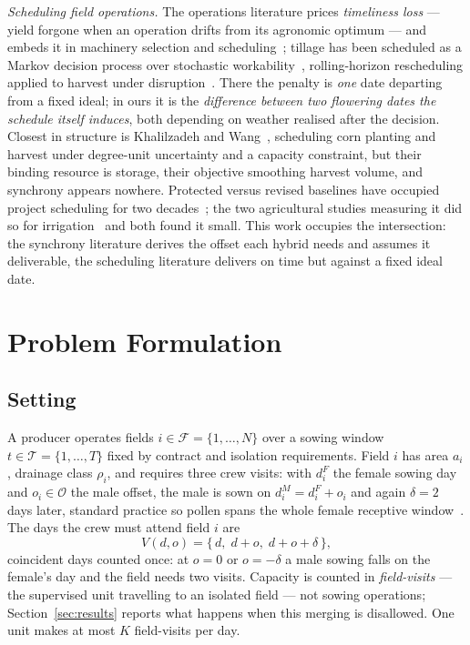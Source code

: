 \documentclass[10pt,twocolumn]{article}
\begin{document}
\emph{Scheduling field operations.} The operations literature prices
\emph{timeliness loss} --- yield forgone when an operation drifts from its
agronomic optimum --- and embeds it in machinery selection and
scheduling~\cite{sun2023}; tillage has been scheduled as a Markov decision
process over stochastic workability~\cite{bagheri2025}, rolling-horizon
rescheduling applied to harvest under
disruption~\cite{rollinghorizon2023}.
There the penalty is \emph{one} date departing from a fixed ideal; in ours
it is the \emph{difference between two flowering dates the schedule itself
induces}, both depending on weather realised after the decision. Closest in
structure is Khalilzadeh and Wang~\cite{khalilzadeh2022}, scheduling corn
planting and harvest under degree-unit uncertainty and a capacity
constraint, but their binding resource is storage, their objective smoothing
harvest volume, and synchrony appears nowhere. Protected versus revised
baselines have occupied project scheduling for two
decades~\cite{lambrechts2007}; the two agricultural studies measuring it did
so for irrigation~\cite{kelly2023,becker2026} and both found it small. This
work occupies the intersection: the synchrony literature derives the offset
each hybrid needs and assumes it deliverable, the scheduling literature
delivers on time but against a fixed ideal date.

\section{Problem Formulation}
\label{sec:formulation}

\subsection{Setting}

A producer operates fields $i \in \mathcal{F} = \{1,\dots,N\}$ over a sowing
window $t \in \mathcal{T} = \{1,\dots,T\}$ fixed by contract and isolation
requirements. Field $i$ has area $a_i$, drainage class $\rho_i$, and
requires three crew visits: with $d^F_i$ the female sowing day and
$o_i \in \mathcal{O}$ the male offset, the male is sown on
$d^M_i = d^F_i + o_i$ and again $\delta = 2$ days later, standard practice
so pollen spans the whole female receptive window~\cite{chassaigne2021}. The
days the crew must attend field $i$ are
\begin{equation}
V(d,o) = \{\, d,\; d+o,\; d+o+\delta \,\},
\label{eq:visits}
\end{equation}
coincident days counted once: at $o = 0$ or $o = -\delta$ a male sowing
falls on the female's day and the field needs two visits. Capacity is
counted in \emph{field-visits} --- the supervised unit travelling to an
isolated field --- not sowing operations; Section~\ref{sec:results} reports
what happens when this merging is disallowed. One unit makes at most $K$
field-visits per day.
\end{document}
